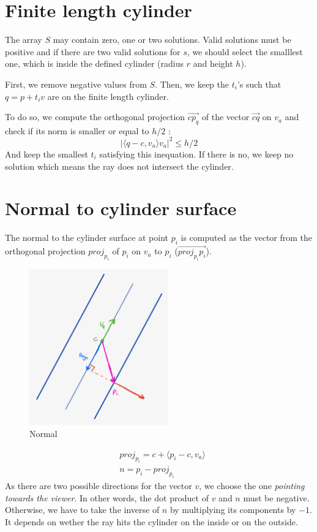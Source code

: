 \documentclass{article}
\begin{document}
\section{Finite length cylinder}
The array $S$ may contain zero, one or two solutions. Valid solutions must be positive and if there are two valid solutions for $s$, we should select the smalllest one, which is inside the defined cylinder (radius $r$ and height $h$).

First, we remove negative values from $S$. Then, we keep the $t_i$'s such that $q = p+t_iv$ are on the finite length cylinder.

To do so, we compute the orthogonal projection $\overrightarrow{cp_q}$ of the vector $\overrightarrow{cq}$ on $v_a$ and check if its norm is smaller or equal to $h/2$ :
$$|\langle q-c, v_a\rangle v_a|^2 \leq h/2$$
And keep the smallest $t_i$ satisfying this inequation. If there is no, we keep no solution which means the ray does not intersect the cylinder.

\section{Normal to cylinder surface}

The normal to the cylinder surface at point $p_i$ is computed as the vector from the orthogonal projection $proj_{p_i}$ of $p_i$ on $v_a$ to $p_i$ ($\overrightarrow{proj_{p_i}p_i}$).

\begin{figure}[h]
\centering
\includegraphics[width=6cm]{res/Normal_sketch.jpeg}
\caption{Normal}
\end{figure}


\begin{align*}
    &proj_{p_i} = c + \langle p_i-c, v_a \rangle \\
    &n = p_i - proj_{p_i}
\end{align*}
As there are two possible directions for the vector $v$, we choose the one \textit{pointing towards the viewer}. In other words, the dot product of $v$ and $n$ must be negative. Otherwise, we have to take the inverse of $n$ by multiplying its components by $-1$. It depends on wether the ray hits the cylinder on the inside or on the outside.
\end{document}
